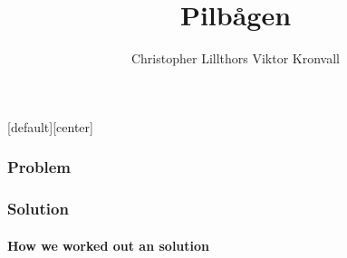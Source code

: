 \documentclass[xcolor=dvipsnames]{beamer}
\author{Christopher Lillthors Viktor Kronvall}
\title{Pilbågen}
\begin{document}
\maketitle
{}[default][center]

\begin{lrbox}{\firstexample}

\end{lrbox}

\begin{lrbox}{\secondexample}

\end{lrbox}

\begin{frame}
\frametitle{Problem}
\usebox{\firstexample}
\end{frame}
\begin{frame}
\frametitle{Solution}
\framesubtitle{How we worked out an solution}
\end{frame}
\end{document}
